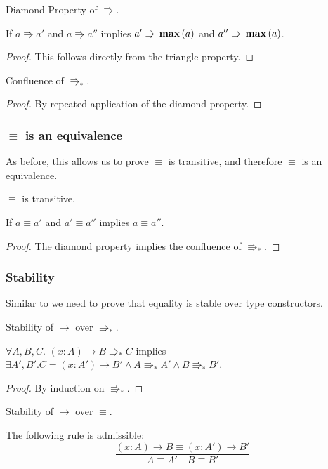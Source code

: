 \begin{lem} Diamond Property of $\Rrightarrow$.
 
If $a\Rrightarrow a'$ and $a\Rrightarrow a''$ implies $a'\Rrightarrow\, \textbf{max}{} \left(a\right)$ and $a''\Rrightarrow\, \textbf{max}{} \left(a\right)$.
\end{lem}
\begin{proof}
  This follows directly from the triangle property.
\end{proof}
 
\begin{lem} Confluence of $\Rrightarrow_{\ast}$.
\end{lem}
\begin{proof}
By repeated application of the diamond property.
\end{proof}
   
\subsubsection{$\equiv$ is an equivalence}
As before, this allows us to prove $\equiv$ is transitive, and therefore $\equiv$ is an equivalence.

\begin{thm} $\equiv$ is transitive.
 
If $a\equiv a'$ and $a'\equiv a''$ implies $a\equiv a''$.
\end{thm}
\begin{proof}
The diamond property implies the confluence of $\Rrightarrow_{\ast}$.
\end{proof}
 
\subsubsection{Stability}
Similar to  we need to prove that equality is stable over type constructors.
\begin{lem} Stability of $\rightarrow$ over $\Rrightarrow_{\ast}$.
 
$\forall A,B,C.$ $\left(x:A\right)\rightarrow B\Rrightarrow_{\ast}C$ implies $\exists A',B'.C=\left(x:A'\right)\rightarrow B'\land A\Rrightarrow_{\ast}A'\land B\Rrightarrow_{\ast}B'$.
\end{lem}
\begin{proof}
By induction on $\Rrightarrow_{\ast}$.
\end{proof}

\begin{cor} Stability of $\rightarrow$ over $\equiv$.
 
The following rule is admissible:
\[
\frac{\left(x:A\right)\rightarrow B\equiv\left(x:A'\right)\rightarrow B'}{A\equiv A'\quad B\equiv B'}
\]
\end{cor}
 
